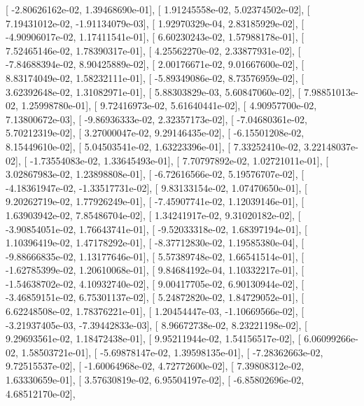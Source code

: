 \documentclass{article}
\begin{document}
       [ -2.80626162e-02,   1.39468690e-01],
       [  1.91245558e-02,   5.02374502e-02],
       [  7.19431012e-02,  -1.91134079e-03],
       [  1.92970329e-04,   2.83185929e-02],
       [ -4.90906017e-02,   1.17411541e-01],
       [  6.60230243e-02,   1.57988178e-01],
       [  7.52465146e-02,   1.78390317e-01],
       [  4.25562270e-02,   2.33877931e-02],
       [ -7.84688394e-02,   8.90425889e-02],
       [  2.00176671e-02,   9.01667600e-02],
       [  8.83174049e-02,   1.58232111e-01],
       [ -5.89349086e-02,   8.73576959e-02],
       [  3.62392648e-02,   1.31082971e-01],
       [  5.88303829e-03,   5.60847060e-02],
       [  7.98851013e-02,   1.25998780e-01],
       [  9.72416973e-02,   5.61640441e-02],
       [  4.90957700e-02,   7.13800672e-03],
       [ -9.86936333e-02,   2.32357173e-02],
       [ -7.04680361e-02,   5.70212319e-02],
       [  3.27000047e-02,   9.29146435e-02],
       [ -6.15501208e-02,   8.15449610e-02],
       [  5.04503541e-02,   1.63223396e-01],
       [  7.33252410e-02,   3.22148037e-02],
       [ -1.73554083e-02,   1.33645493e-01],
       [  7.70797892e-02,   1.02721011e-01],
       [  3.02867983e-02,   1.23898808e-01],
       [ -6.72616566e-02,   5.19576707e-02],
       [ -4.18361947e-02,  -1.33517731e-02],
       [  9.83133154e-02,   1.07470650e-01],
       [  9.20262719e-02,   1.77926249e-01],
       [ -7.45907741e-02,   1.12039146e-01],
       [  1.63903942e-02,   7.85486704e-02],
       [  1.34241917e-02,   9.31020182e-02],
       [ -3.90854051e-02,   1.76643741e-01],
       [ -9.52033318e-02,   1.68397194e-01],
       [  1.10396419e-02,   1.47178292e-01],
       [ -8.37712830e-02,   1.19585380e-04],
       [ -9.88666835e-02,   1.13177646e-01],
       [  5.57389748e-02,   1.66541514e-01],
       [ -1.62785399e-02,   1.20610068e-01],
       [  9.84684192e-04,   1.10332217e-01],
       [ -1.54638702e-02,   4.10932740e-02],
       [  9.00417705e-02,   6.90130944e-02],
       [ -3.46859151e-02,   6.75301137e-02],
       [  5.24872820e-02,   1.84729052e-01],
       [  6.62248508e-02,   1.78376221e-01],
       [  1.20454447e-03,  -1.10669566e-02],
       [ -3.21937405e-03,  -7.39442833e-03],
       [  8.96672738e-02,   8.23221198e-02],
       [  9.29693561e-02,   1.18472438e-01],
       [  9.95211944e-02,   1.54156517e-02],
       [  6.06099266e-02,   1.58503721e-01],
       [ -5.69878147e-02,   1.39598135e-01],
       [ -7.28362663e-02,   9.72515537e-02],
       [ -1.60064968e-02,   4.72772600e-02],
       [  7.39808312e-02,   1.63330659e-01],
       [  3.57630819e-02,   6.95504197e-02],
       [ -6.85802696e-02,   4.68512170e-02],
\end{document}

